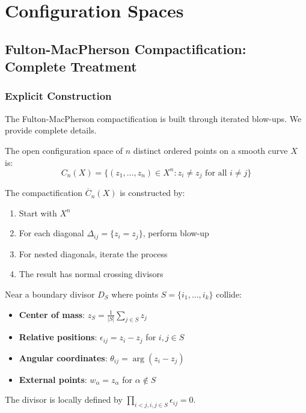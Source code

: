 \chapter{Configuration Spaces}
\section{Fulton-MacPherson Compactification: Complete Treatment}

\subsection{Explicit Construction}

The Fulton-MacPherson compactification is built through iterated blow-ups. We provide complete details.

\begin{definition}
The open configuration space of $n$ distinct ordered points on a smooth curve $X$ is:
$$C_n(X) = \{(z_1, \ldots, z_n) \in X^n : z_i \neq z_j \text{ for all } i \neq j\}$$
\end{definition}

\begin{definition}
The compactification $\overline{C}_n(X)$ is constructed by:
\begin{enumerate}
\item Start with $X^n$
\item For each diagonal $\Delta_{ij} = \{z_i = z_j\}$, perform blow-up
\item For nested diagonals, iterate the process
\item The result has normal crossing divisors
\end{enumerate}
\end{definition}

\begin{theorem}
Near a boundary divisor $D_S$ where points $S = \{i_1, \ldots, i_k\}$ collide:
\begin{itemize}
\item \textbf{Center of mass}: $z_S = \frac{1}{|S|}\sum_{j \in S} z_j$
\item \textbf{Relative positions}: $\epsilon_{ij} = z_i - z_j$ for $i,j \in S$
\item \textbf{Angular coordinates}: $\theta_{ij} = \arg(z_i - z_j)$
\item \textbf{External points}: $w_\alpha = z_\alpha$ for $\alpha \notin S$
\end{itemize}
The divisor is locally defined by $\prod_{i<j, i,j \in S} \epsilon_{ij} = 0$.
\end{theorem}

